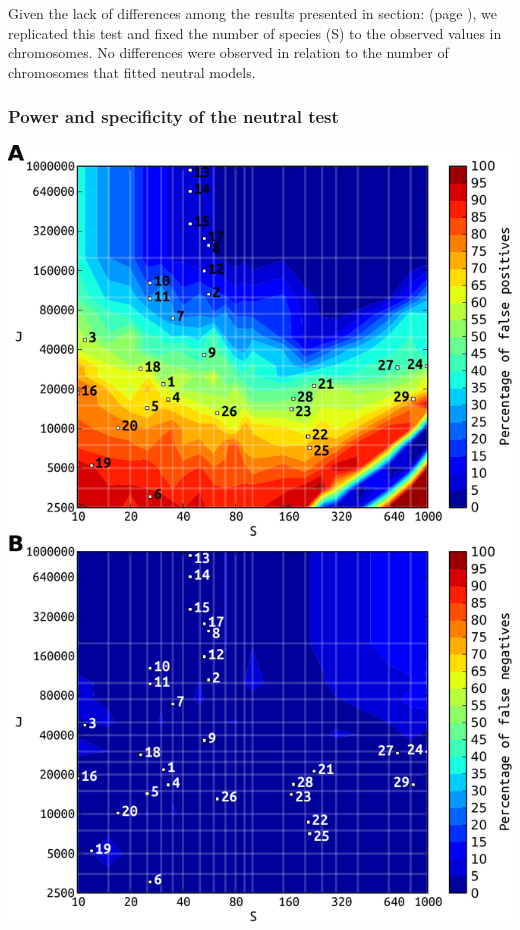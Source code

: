 Given the lack of differences among the results presented in section: \textbf{} (page \pageref{sec:neutrality-sad}), we replicated this test and fixed the number of species (S) to the observed values in chromosomes. No differences were observed in relation to the number of chromosomes that fitted neutral models.

\subsubsection{Power and specificity of the neutral test}
\label{sec:power-spec-neutr}
\begin{PPfigure}
  \qquad
\includegraphics[height=.9\textheight]{figures/material_methods/power_and_sensitivity_test.pdf}

\end{PPfigure}
